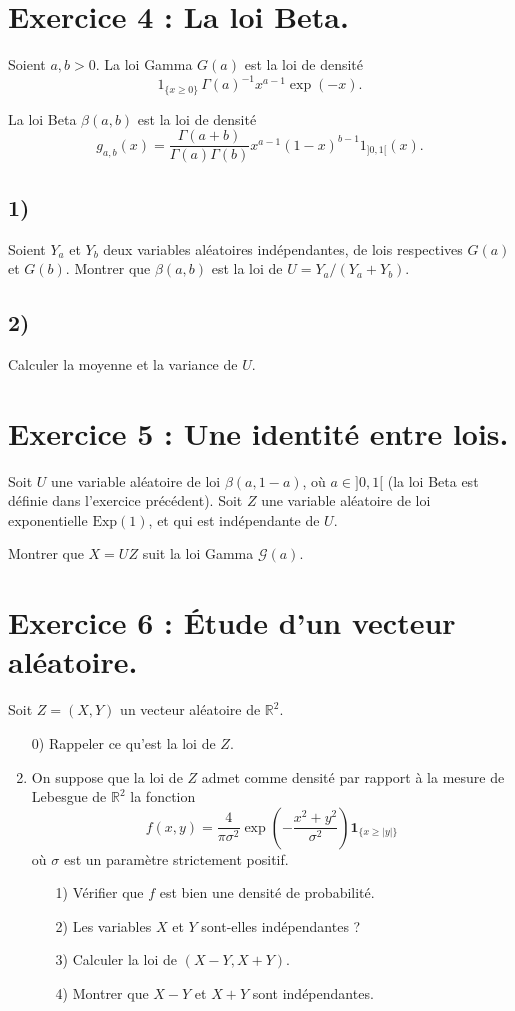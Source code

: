 \documentclass[12pt,a4paper]{article}
\begin{document}
\section*{Exercice 4 : La loi Beta.}

Soient $a,b > 0$. La loi Gamma $G(a)$ est la loi de densité
\[
1_{\{x \geq 0\}} \, \Gamma(a)^{-1} x^{a-1} \exp(-x).
\]

La loi Beta $\beta(a,b)$ est la loi de densité
\[
g_{a,b}(x) = \frac{\Gamma(a+b)}{\Gamma(a)\Gamma(b)} x^{a-1}(1-x)^{b-1} 1_{]0,1[}(x).
\]

\subsection*{1)} Soient $Y_a$ et $Y_b$ deux variables aléatoires indépendantes, de lois respectives $G(a)$ et $G(b)$. Montrer que $\beta(a,b)$ est la loi de $U = Y_a / (Y_a + Y_b)$.  

\subsection*{2)} Calculer la moyenne et la variance de $U$.  

\section*{Exercice 5 : Une identité entre lois.}

Soit $U$ une variable aléatoire de loi $\beta(a,1-a)$, où $a \in ]0,1[$ (la loi Beta est définie dans l'exercice précédent).  
Soit $Z$ une variable aléatoire de loi exponentielle $\text{Exp}(1)$, et qui est indépendante de $U$.  

Montrer que $X = UZ$ suit la loi Gamma $\mathcal{G}(a)$.

\bigskip

\section*{Exercice 6 : Étude d’un vecteur aléatoire.}

Soit $Z = (X,Y)$ un vecteur aléatoire de $\mathbb{R}^2$.  

\begin{enumerate}
    \item[0)] Rappeler ce qu’est la loi de $Z$.
    \item On suppose que la loi de $Z$ admet comme densité par rapport à la mesure de Lebesgue de $\mathbb{R}^2$ la fonction
    \[
        f(x,y) = \frac{4}{\pi \sigma^2} \exp\!\left(-\frac{x^2+y^2}{\sigma^2}\right)\mathbf{1}_{\{x \geq |y|\}}
    \]
    où $\sigma$ est un paramètre strictement positif.
    \begin{enumerate}
        \item[1)] Vérifier que $f$ est bien une densité de probabilité.
        \item[2)] Les variables $X$ et $Y$ sont-elles indépendantes ?
        \item[3)] Calculer la loi de $(X-Y, X+Y)$.
        \item[4)] Montrer que $X-Y$ et $X+Y$ sont indépendantes.
    \end{enumerate}
\end{enumerate}
\end{document}
